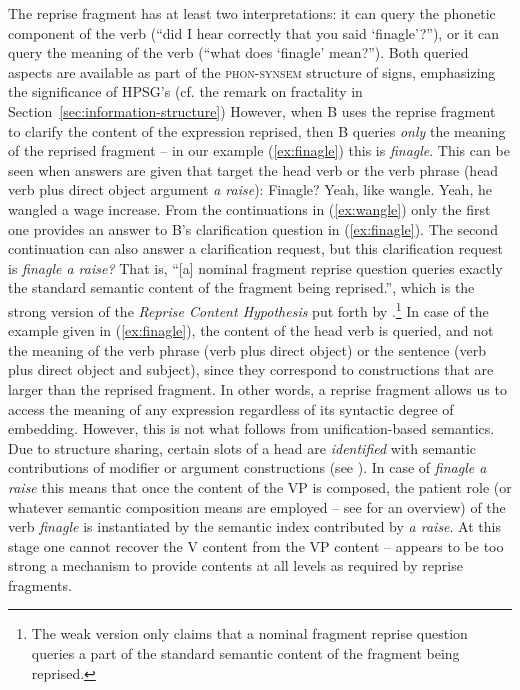 \documentclass[output=paper]{langsci/langscibook}
\begin{document}
{The reprise fragment has at least two interpretations: it can query the phonetic component of the verb (\enquote{did I hear correctly that you said \enquote{finagle}?}), or it can query the meaning of the verb (\enquote{what does \enquote{finagle} mean?}).
%
Both queried aspects are available as part of the \textsc{phon-synsem} structure of signs, emphasizing the significance of HPSG's   (cf. the remark on fractality in Section~\ref{sec:information-structure})
%
However, when B uses the reprise fragment to clarify the content of the expression reprised, then B queries \emph{only} the meaning of the reprised fragment \citep{Purver:Ginzburg:2004,Ginzburg:Purver:2012} -- in our example (\ref{ex:finagle}) this is \textit{finagle}.
%
This can be seen when answers are given that target the head verb or the verb phrase (head verb plus direct object argument \textit{a raise}):
%
\ea \label{ex:wangle} Finagle?
 \ea Yeah, like wangle.
 \ex Yeah, he wangled a wage increase.
 \z 
\z
%
From the continuations in (\ref{ex:wangle}) only the first one provides an answer to B's clarification question in (\ref{ex:finagle}).
%
The second continuation can also answer a clarification request, but this clarification request is \textit{finagle a raise?}
%
That is, \enquote{[a] nominal fragment reprise question queries exactly the standard semantic content of the fragment being reprised.}, which is the strong version of the \emph{Reprise Content Hypothesis}  put forth by \citet[]{Purver:Ginzburg:2004}.\footnote{The weak version \citep[]{Purver:Ginzburg:2004} only claims that a nominal fragment reprise question queries a part of the standard semantic content of the fragment being reprised.}
%
In case of the example given in (\ref{ex:finagle}), the content of the head verb is queried, and not the meaning of the verb phrase (verb plus direct object) or the sentence (verb plus direct object and subject), since they correspond to constructions that are larger than the reprised fragment. 
%
In other words, a reprise fragment allows us to access the meaning of any expression regardless of its syntactic degree of embedding. 
%
However, this is not what follows from unification-based semantics.
%
Due to structure sharing, certain slots of a head are \emph{identified} with semantic contributions of modifier or argument constructions (see  ).
%
In case of \textit{finagle a raise} this means that once the content of the VP is composed, the patient role (or whatever semantic composition means are employed -- see  for an overview) of the verb \textit{finagle} is instantiated by the semantic index contributed by \textit{a raise}.
%
At this stage one cannot recover the V content from the VP content --  appears to be too strong a mechanism to provide contents at all levels as required by reprise fragments. 


}
\end{document}
